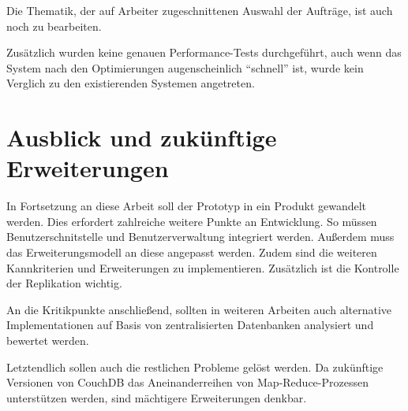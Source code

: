 Die Thematik, der auf Arbeiter zugeschnittenen Auswahl der Aufträge, ist auch noch zu bearbeiten.

Zusätzlich wurden keine genauen Performance-Tests durchgeführt,
auch wenn das System nach den Optimierungen augenscheinlich ``schnell'' ist,
wurde kein Verglich zu den existierenden Systemen angetreten.





\section{Ausblick und zukünftige Erweiterungen}
\label{sec:fazit:ausblick}
In Fortsetzung an diese Arbeit soll der Prototyp in ein Produkt gewandelt werden.
Dies erfordert zahlreiche weitere Punkte an Entwicklung.
So müssen Benutzerschnitstelle und Benutzerverwaltung integriert werden.
Außerdem muss das Erweiterungsmodell an diese angepasst werden.
Zudem sind die weiteren Kannkriterien und Erweiterungen zu implementieren.
Zusätzlich ist die Kontrolle der Replikation wichtig.

An die Kritikpunkte anschließend, sollten in weiteren Arbeiten auch alternative Implementationen auf Basis von zentralisierten Datenbanken analysiert und bewertet werden.

Letztendlich sollen auch die restlichen Probleme gelöst werden.
Da zukünftige Versionen von CouchDB das Aneinanderreihen von Map-Reduce-Prozessen unterstützen werden,
sind mächtigere Erweiterungen denkbar.

